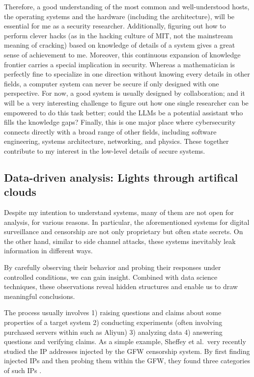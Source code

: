 \documentclass[10pt]{article}
\begin{document}
Therefore, a good understanding of the most common and well-understood hosts,
the operating systems and the hardware (including the architecture), will be
essential for me as a security researcher. Additionally, figuring out how to
perform clever hacks (as in the hacking culture of MIT, not the mainstream
meaning of cracking) based on knowledge of details of a system gives a great
sense of achievement to me. Moreover, this continuous expansion of knowledge
frontier carries a special implication in security. Whereas a mathematician is
perfectly fine to specialize in one direction without knowing every details in
other fields, a computer system can never be secure if only designed with one
perspective. For now, a good system is usually designed by collaboration; and
it will be a very interesting challenge to figure out how one single researcher
can be empowered to do this task better; could the LLMs be a potential
assistant who fills the knowledge gaps? Finally, this is one major place where
cybersecurity connects directly with a broad range of other fields, including
software engineering, systems architecture, networking, and physics.  These
together contribute to my interest in the low-level details of secure systems.

\subsection[Data-driven analysis]{
Data-driven analysis: Lights through artifical clouds}
Despite my intention to understand systems, many of them are not open for
analysis, for various reasons. In particular, the aforementioned systems for
digital surveillance and censorship are not only proprietary but often state
secrets. On the other hand, similar to side channel attacks, these systems
inevitably leak information in different ways.

By carefully observing their behavior and probing their responses under
controlled conditions, we can gain insight. Combined with data science
techniques, these observations reveal hidden structures and enable us to draw
meaningful conclusions.

The process usually involves 1) raising questions and claims about some
properties of a target system 2) conducting experiments (often involving
purchased servers within such as Aliyun) 3) analyzing data 4) answering
questions and verifying claims. As a simple example, Sheffey et al.\ very
recently studied the IP addresses injected by the GFW censorship system. By
first finding injected IPs and then probing them within the GFW, they found
three categories of such IPs \cite{gfw.injected.ip}. 
\end{document}
